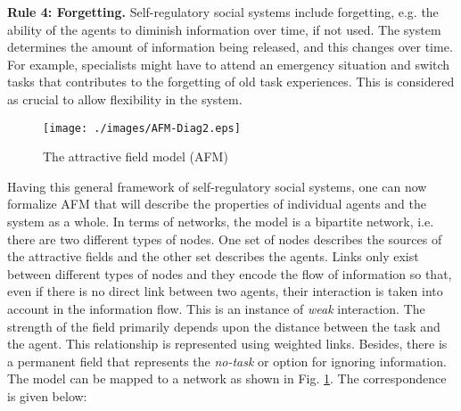 \textbf{Rule 4: Forgetting.} Self-regulatory social systems include forgetting, e.g. the ability of the agents to diminish information over time, if not used. The system determines the amount of information being released, and this changes over time. For example, specialists might have to attend an emergency situation and switch tasks that contributes to the forgetting of old task experiences. This is considered as crucial to allow flexibility in the system.
\begin{figure}
\centering
\texttt{[image: ./images/AFM-Diag2.eps]}
\caption{The attractive field model (AFM)}
\label{fig:afm} %
\end{figure}
Having this general framework of self-regulatory social systems, one can now formalize AFM that will describe the properties of individual  agents and the system as a whole. In terms of networks, the model is a bipartite network, i.e. there are two different types of nodes. One set of nodes describes the sources of the attractive fields and the other set describes the agents. Links only exist between different types of nodes and they encode the flow of information so that, even if there is no direct link between two agents, their interaction is taken into account in the information flow. This is an instance of {\em weak} interaction. The strength of the field primarily depends upon the distance between the task and the agent. This relationship is represented using weighted links. Besides, there is a permanent field that represents the {\em no-task} or  option for ignoring information. The model can be mapped to a network as shown in Fig. \ref{fig:afm}. The correspondence is given below:
